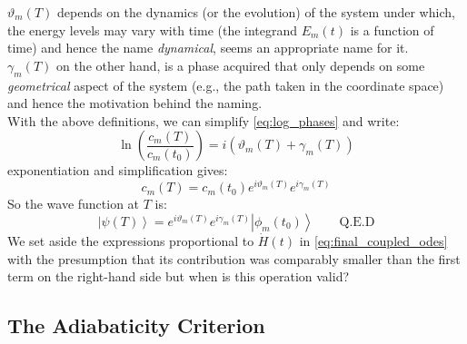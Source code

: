 \documentclass[12pt,a4paper]{article}
\begin{document}
	$\vartheta_{m}(T)$ depends on the dynamics (or the evolution) of the system under which, the energy levels may vary with time (the integrand $E_{m}(t)$ is a function of time) and hence the name \emph{dynamical}, seems an appropriate name for it.\\
	$\gamma_{m}(T)$ on the other hand, is a phase acquired that only depends on some \emph{geometrical} aspect of the system (e.g., the path taken in the coordinate space) and hence the motivation behind the naming.\\
	
	With the above definitions, we can simplify \eqref{eq:log_phases} and write:
	\begin{equation}
		\ln\left(\frac{c_{m}(T)}{c_{m}(t_{0})}\right) = i \left( \vartheta_{m}(T) + \gamma_{m}(T) \right)
		\label{eq:log_phases_combined}
	\end{equation}
	exponentiation and simplification gives:
	\begin{equation}
		c_{m}(T) = c_{m}(t_{0}) e^{i \vartheta_{m}(T)} e^{i \gamma_{m}(T)}
		\label{eq:coefficient_solution}
	\end{equation}
	So the wave function at $T$ is:
	\begin{equation}
		\boxed{
			\left| \psi(T) \right\rangle = e^{i \vartheta_{m}(T)} e^{i \gamma_{m}(T)} \left| \phi_{m}(t_{0}) \right\rangle
		} \qquad \text{Q.E.D}
		\label{eq:adiabatic_wavefunction}
	\end{equation}
	We set aside the expressions proportional to $\dot{H}(t)$ in \eqref{eq:final_coupled_odes} with the presumption that its contribution was comparably smaller than the first term on the right-hand side but when is this operation valid?
	
	\subsection{The Adiabaticity Criterion}
	\label{subsec:adiabatic_criterion}
	
\end{document}
